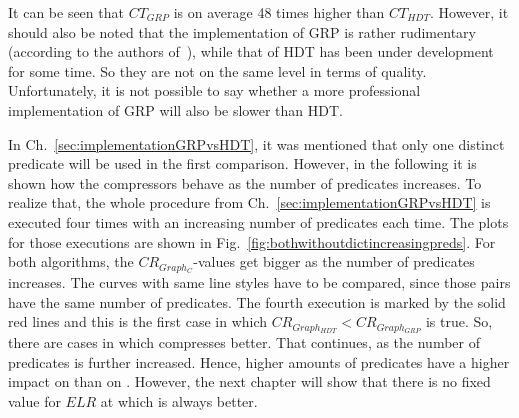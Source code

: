 \FloatBarrier

It can be seen that $CT_{GRP}$ is on average 48 times higher than $CT_{HDT}$. However, it should also be noted that the implementation of GRP is rather rudimentary  (according to the authors of~\cite{maneth}), while that of HDT has been under development for some time. So they are not on the same level in terms of quality. Unfortunately, it is not possible to say whether a more professional implementation of GRP will also be slower than HDT.

In Ch.~\ref{sec:implementationGRPvsHDT}, it was mentioned that only one distinct predicate will be used in the first comparison. However, in the following it is shown how the compressors behave as the number of predicates increases. To realize that, the whole procedure from Ch.~\ref{sec:implementationGRPvsHDT} is executed  four times with an increasing number of predicates each time. The plots for those executions are shown in Fig.~\ref{fig:bothwithoutdictincreasingpreds}. For both algorithms, the $CR_{Graph_C}$-values get bigger as the number of predicates increases. The curves with same line styles have to be compared, since those pairs have the same number of predicates. The fourth execution is marked by the solid red lines and this is the first case in which $CR_{Graph_{HDT}} <CR_{Graph_{GRP}} $ is true. So, there are cases in which \GHDT{} compresses better. That continues, as the number of predicates is further increased. Hence, higher amounts of predicates have a higher impact on \GGRP{} than on \GHDT{}. However, the next chapter will show that there is no fixed value for $ELR$ at which \GHDT{} is always better.

